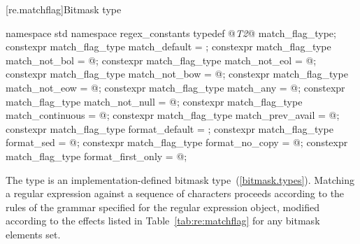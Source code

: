 [re.matchflag]{Bitmask type }

%
%
%
%
%
%
%
%
%
%
%
%
%
%
%
\begin{codeblock}
namespace std {
  namespace regex_constants{
    typedef @\textit{T2}@ match_flag_type;
    constexpr match_flag_type match_default = {};
    constexpr match_flag_type match_not_bol = @\unspec@;
    constexpr match_flag_type match_not_eol = @\unspec@;
    constexpr match_flag_type match_not_bow = @\unspec@;
    constexpr match_flag_type match_not_eow = @\unspec@;
    constexpr match_flag_type match_any = @\unspec@;
    constexpr match_flag_type match_not_null = @\unspec@;
    constexpr match_flag_type match_continuous = @\unspec@;
    constexpr match_flag_type match_prev_avail = @\unspec@;
    constexpr match_flag_type format_default = {};
    constexpr match_flag_type format_sed = @\unspec@;
    constexpr match_flag_type format_no_copy = @\unspec@;
    constexpr match_flag_type format_first_only = @\unspec@;
  }
}
\end{codeblock}

\pnum
{}%
The type  is an implementation-defined bitmask
type~(\ref{bitmask.types}). Matching a regular expression against a sequence of characters
 proceeds according to the rules of the grammar specified for the regular
expression object, modified according to the effects listed in Table~\ref{tab:re:matchflag} for
any bitmask elements set.

